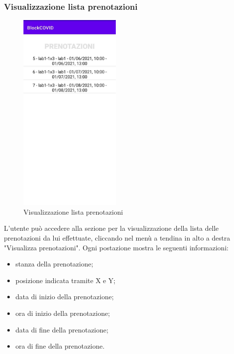 \subsubsection{Visualizzazione lista prenotazioni}
\begin{figure}[H]
	\centering
	\includegraphics[width=5cm]{res/images/VisualizzaPrenotazioni.png}
	\caption{Visualizzazione lista prenotazioni}
\end{figure}
L’utente può accedere alla sezione per la visualizzazione della lista delle prenotazioni da lui effettuate, cliccando nel menù a tendina in alto a destra "Visualizza prenotazioni".
Ogni postazione mostra le seguenti informazioni:
\begin{itemize}
	\item stanza della prenotazione;
	\item posizione indicata tramite X e Y;
	\item data di inizio della prenotazione;
	\item ora di inizio della prenotazione;
	\item data di fine della prenotazione;
	\item ora di fine della prenotazione.
\end{itemize}
